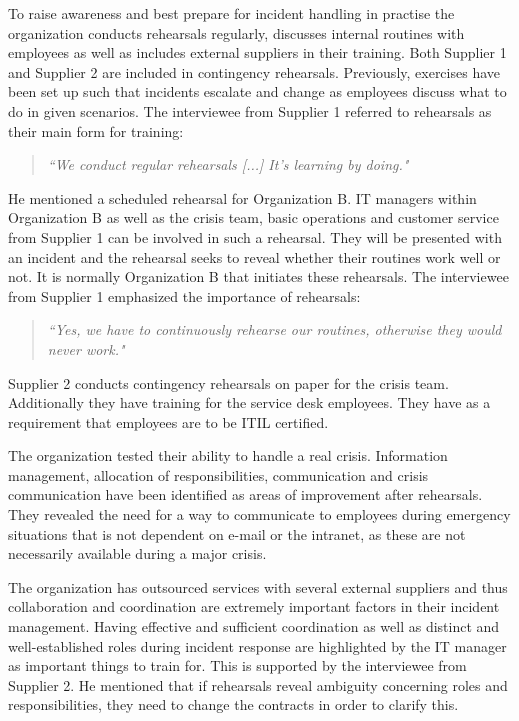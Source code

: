 \documentclass[b5paper, twoside, openright, 11pt]{report}
\begin{document}
To raise awareness and best prepare for incident handling in practise the organization conducts rehearsals regularly, discusses internal routines with employees as well as includes external suppliers in their training. Both Supplier 1 and Supplier 2 are included in contingency rehearsals. Previously, exercises have been set up such that incidents escalate and change as employees discuss what to do in given scenarios. The interviewee from Supplier 1 referred to rehearsals as their main form for training:

\begin{quote}
\textit{``We conduct regular rehearsals [...] It's learning by doing."}
\end{quote}

He mentioned a scheduled rehearsal for Organization B. IT managers within Organization B as well as the crisis team, basic operations and customer service from Supplier 1 can be involved in such a rehearsal. They will be presented with an incident and the rehearsal seeks to reveal whether their routines work well or not. It is normally Organization B that initiates these rehearsals. The interviewee from Supplier 1 emphasized the importance of rehearsals:

\begin{quote}
\textit{``Yes, we have to continuously rehearse our routines, otherwise they would never work."}
\end{quote}

Supplier 2 conducts contingency rehearsals on paper for the crisis team. Additionally they have training for the service desk employees. They have as a requirement that employees are to be \ac{ITIL} certified.

The organization tested their ability to handle a real crisis. Information management, allocation of responsibilities, communication and crisis communication have been identified as areas of improvement after rehearsals. They revealed the need for a way to communicate to employees during emergency situations that is not dependent on e-mail or the intranet, as these are not necessarily available during a major crisis.

The organization has outsourced services with several external suppliers and thus collaboration and coordination are extremely important factors in their incident management. Having effective and sufficient coordination as well as distinct and well-established roles during incident response are highlighted by the IT manager as important things to train for. This is supported by the interviewee from Supplier 2. He mentioned that if rehearsals reveal ambiguity concerning roles and responsibilities, they need to change the contracts in order to clarify this.
\end{document}
